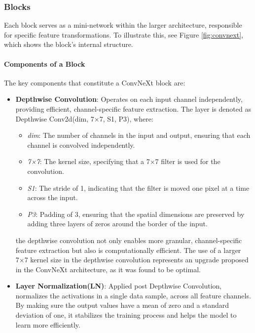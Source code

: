 \documentclass[a4paper,12pt,openright]{book}
\begin{document}
\subsubsection{Blocks}
Each block serves as a mini-network within the larger architecture, responsible for specific feature transformations. To illustrate this, see Figure \ref{fig:convnext}, which shows the block's internal structure.


\paragraph{Components of a Block}
The key components that constitute a ConvNeXt block are:

\begin{itemize}
      \item \textbf{Depthwise Convolution}: Operates on each input channel independently, providing efficient, channel-specific feature extraction. The layer is denoted as Depthwise Conv2d(dim, 7×7, S1, P3), where:
\begin{itemize}
\item \textit{dim}: The number of channels in the input and output, ensuring that each channel is convolved independently.
\item \textit{7×7}: The kernel size, specifying that a 7×7 filter is used for the convolution.
\item \textit{S1}: The stride of 1, indicating that the filter is moved one pixel at a time across the input.
\item \textit{P3}: Padding of 3, ensuring that the spatial dimensions are preserved by adding three layers of zeros around the border of the input.
\end{itemize}

the depthwise convolution not only enables more granular, channel-specific feature extraction but also is computationally efficient. The use of a larger 7×7 kernel size in the depthwise convolution represents an upgrade proposed in the ConvNeXt architecture, as it was found to be optimal\cite{DBLP:journals/corr/abs-2201-03545}.
    
    \item \textbf{Layer Normalization(LN)}: Applied post Depthwise Convolution, normalizes the activations in a single data sample, across all feature channels. By making sure the output values have a mean of zero and a standard deviation of one, it stabilizes the training process and helps the model to learn more efficiently.
    

\end{itemize}
\end{document}
